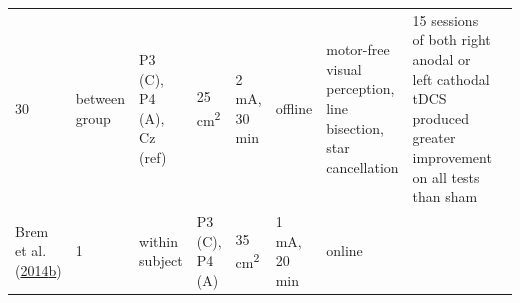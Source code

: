 \documentclass[11pt,]{memoir}
\begin{document}
\begin{longtable}[]{@{}lllllllll@{}}
\begin{minipage}[t]{0.02\columnwidth}
30\strut
\end{minipage} & \begin{minipage}[t]{0.04\columnwidth}\raggedright
between
group\strut
\end{minipage} & \begin{minipage}[t]{0.10\columnwidth}\raggedright
P3 (C), P4 (A), Cz (ref)\strut
\end{minipage} & \begin{minipage}[t]{0.03\columnwidth}\raggedright
25
cm\textsuperscript{2}\strut
\end{minipage} & \begin{minipage}[t]{0.05\columnwidth}\raggedright
2 mA, 30
min\strut
\end{minipage} & \begin{minipage}[t]{0.04\columnwidth}\raggedright
offline\strut
\end{minipage} & \begin{minipage}[t]{0.15\columnwidth}\raggedright
motor-free visual perception, line
bisection, star cancellation\strut
\end{minipage} & \begin{minipage}[t]{0.24\columnwidth}\raggedright
15 sessions of both right anodal or left cathodal tDCS
produced greater improvement on all tests than sham\strut
\end{minipage}\tabularnewline
\begin{minipage}[t]{0.09\columnwidth}\raggedright
Brem et al. (\protect\hyperlink{ref-Brem2014}{2014}\protect\hyperlink{ref-Brem2014}{b})\strut
\end{minipage} & \begin{minipage}[t]{0.02\columnwidth}\raggedright
1\strut
\end{minipage} & \begin{minipage}[t]{0.04\columnwidth}\raggedright
within
subject\strut
\end{minipage} & \begin{minipage}[t]{0.10\columnwidth}\raggedright
P3 (C), P4 (A)\strut
\end{minipage} & \begin{minipage}[t]{0.03\columnwidth}\raggedright
35
cm\textsuperscript{2}\strut
\end{minipage} & \begin{minipage}[t]{0.05\columnwidth}\raggedright
1 mA, 20
min\strut
\end{minipage} & \begin{minipage}[t]{0.04\columnwidth}\raggedright
online\strut
\end{minipage} & \begin{minipage}[t]{0.15\columnwidth}\raggedright

\end{minipage}
\end{longtable}
\end{document}
